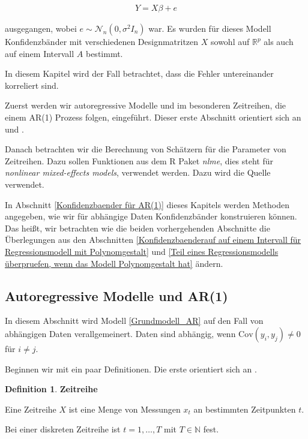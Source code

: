 \documentclass[12pt,a4paper]{article}
\theoremstyle{definition}
\newtheorem{Definition}{Definition}[subsection]
\theoremstyle{definition}
\theoremstyle{definition}
\theoremstyle{definition}
\begin{document}
\begin{align} \label{Grundmodell_AR}
Y = X \beta + e
\end{align}

ausgegangen, wobei $e \sim \mathscr{N}_{n}(0, \sigma^2 I_n)$ war.  Es wurden für dieses Modell Konfidenzbänder mit verschiedenen Designmatritzen $X$ sowohl auf $\mathbb{R}^{p}$ als auch auf einem Intervall $A$ bestimmt.

In diesem Kapitel wird der Fall betrachtet, dass die Fehler untereinander korreliert sind. 

Zuerst werden wir autoregressive Modelle und im besonderen Zeitreihen, die einem AR(1) Prozess folgen, eingeführt. Dieser erste Abschnitt orientiert sich an \cite{Hansen15} und \cite{Brockwell91}.

Danach betrachten wir die Berechnung von Schätzern für die Parameter von Zeitreihen. Dazu sollen Funktionen aus dem R Paket \textit{nlme}, dies steht für \textit{nonlinear mixed-effects models}, verwendet werden. Dazu wird die Quelle \cite{Pinheiro00} verwendet.

In Abschnitt \ref{Konfidenzbaender für AR(1)} dieses Kapitels werden Methoden angegeben, wie wir für abhängige Daten Konfidenzbänder konstruieren können. Das heißt, wir betrachten wie die beiden vorhergehenden Abschnitte die Überlegungen aus den Abschnitten \ref{Konfidenzbaenderauf auf einem Intervall für Regressionsmodell mit Polynomgestalt} und \ref{Teil eines Regressionsmodells überpruefen, wenn das Modell Polynomgestalt hat} ändern.


\subsection{Autoregressive Modelle und AR(1)}
\label{Regression für AR(1)}
In diesem Abschnitt wird Modell \eqref{Grundmodell_AR} auf den Fall von abhängigen Daten verallgemeinert. Daten sind abhängig, wenn $\text{Cov}(y_i,y_j) \neq 0$ für $i \neq j$.

Beginnen wir mit ein paar Definitionen. Die erste orientiert sich an \cite[1]{Brockwell91}.

\begin{Definition}
\textbf{Zeitreihe}

Eine Zeitreihe $X$ ist eine Menge von Messungen $x_t$ an bestimmten Zeitpunkten $t$. 

Bei einer diskreten Zeitreihe ist $ t=1, \ldots, T $ mit $T \in \mathbb{N}$ fest. 
\end{Definition}
\end{document}
